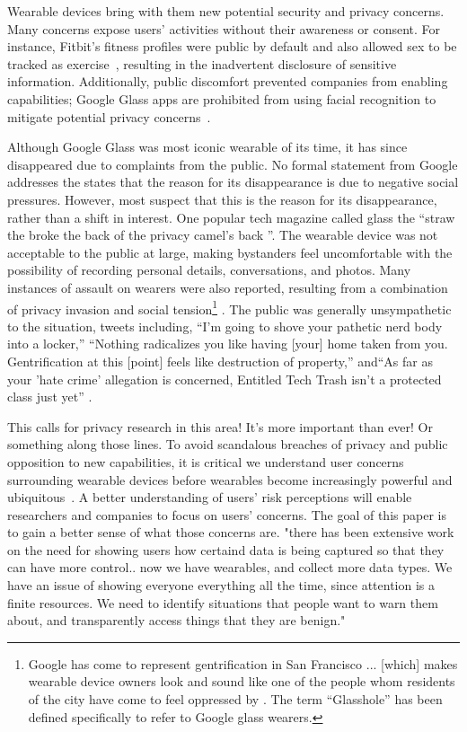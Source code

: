 Wearable devices bring with them new potential security and privacy concerns. Many concerns expose users' activities without their awareness or consent. For instance, Fitbit's fitness profiles were public by default and also allowed sex to be tracked as exercise~\cite{Fitbit}, resulting in the inadvertent disclosure of sensitive information. Additionally, public discomfort prevented companies from enabling capabilities; Google Glass apps are prohibited from using facial recognition to mitigate potential privacy concerns~\cite{GlassDetection}.

Although Google Glass was most iconic wearable of its time, it has since disappeared due to complaints from the public\cite{13_google_2015}. No formal statement from Google addresses the states that the reason for its disappearance is due to negative social pressures. However, most suspect that this is the reason for its disappearance, rather than a shift in interest. One popular tech magazine called glass the ``straw the broke the back of the privacy camel's back \cite{14_dvorak_2014}''. The wearable device was not acceptable to the public at large, making bystanders feel uncomfortable with the possibility of recording personal details, conversations, and photos. Many instances of assault \cite{1_russell_2014, 15_mashable_2014, 16_gross_2014} on wearers were also reported, resulting from a combination of privacy invasion and social tension\footnote{Google has come to represent gentrification in San Francisco ... [which] makes wearable device owners look and sound like one of the people whom residents of the city have come to feel oppressed by \cite{17_matyszczyk_2014}. The term ``Glasshole'' \cite{18_google_2015} has been defined specifically to refer to Google glass wearers.} . The public was generally unsympathetic to the situation, tweets including, ``I'm going to shove your pathetic nerd body into a locker,'' ``Nothing radicalizes you like having [your] home taken from you. Gentrification at this [point] feels like destruction of property,'' and``As far as your 'hate crime' allegation is concerned, Entitled Tech Trash isn't a protected class just yet'' \cite{1_russell_2014,15_mashable_2014}.

{\color {red} This calls for privacy research in this area! It's more important than ever! Or something along those lines.}  To avoid scandalous breaches of privacy and public opposition to new capabilities, it is critical we understand user concerns surrounding wearable devices before wearables become increasingly powerful and ubiquitous~\cite{Implants}. A better understanding of users' risk perceptions will enable researchers and companies to focus on users' concerns. The goal of this paper is to gain a better sense of what those concerns are.  {\color {red} "there has been extensive work on the need for showing users how certaind data is being captured so that they can have more control.. now we have wearables, and collect more data types. We have an issue of showing everyone everything all the time, since attention is a finite resources. We need to identify situations that people want to warn them about, and transparently access things that they are benign."}


